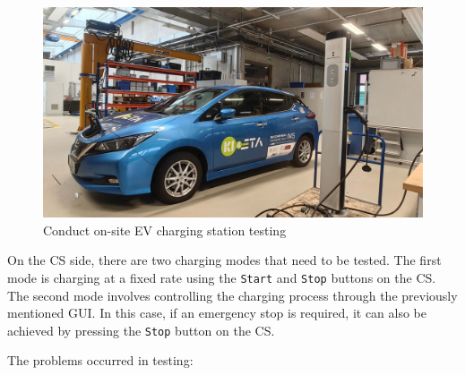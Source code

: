 \documentclass[
	english,
	ruledheaders=section,%
	class=report,%
	thesis={type=Report},%
	accentcolor=9c,%
	custommargins=true,%
	marginpar=false,%
	parskip=half-,%
	fontsize=11pt,%
	logofile={img/tuda_logo.pdf}, %
]{tudapub}
\begin{document}
\begin{figure}[H]
        \centering
        \includegraphics[width=0.8\linewidth]{img/Testing.jpg}
        \caption{Conduct on-site EV charging station testing}
        \label{fig:Testing}
    \end{figure}

On the \ac{CS} side, there are two charging modes that need to be tested. The first mode is charging at a fixed rate using the \texttt{Start} and \texttt{Stop} buttons on the \ac{CS}. The second mode involves controlling the charging process through the previously mentioned \ac{GUI}. In this case, if an emergency stop is required, it can also be achieved by pressing the \texttt{Stop} button on the \ac{CS}.

The problems occurred in testing:





\end{document}
